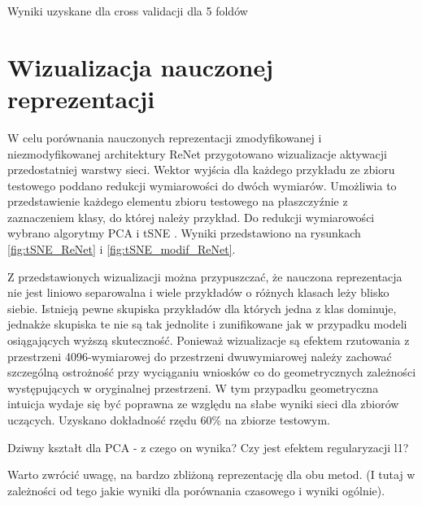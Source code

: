\documentclass[oneside, mag]{mgr}
\begin{document}
\begin{table}[ht]
    \centering
    \caption{Wyniki uzyskane dla cross validacji dla 5 foldów}
    
    \label{table:cross_validation}
\end{table}

\section{Wizualizacja nauczonej reprezentacji}

W celu porównania nauczonych reprezentacji zmodyfikowanej i niezmodyfikowanej architektury ReNet przygotowano wizualizacje aktywacji przedostatniej warstwy sieci. Wektor wyjścia dla każdego przykładu ze zbioru testowego poddano redukcji wymiarowości do dwóch wymiarów. Umożliwia to przedstawienie każdego elementu zbioru testowego na płaszczyźnie z zaznaczeniem klasy, do której należy przykład. Do redukcji wymiarowości wybrano algorytmy PCA i tSNE \cite{tSNE}. Wyniki przedstawiono na rysunkach \ref{fig:tSNE_ReNet} i \ref{fig:tSNE_modif_ReNet}.

Z przedstawionych wizualizacji można przypuszczać, że nauczona reprezentacja nie jest liniowo separowalna i wiele przykładów o różnych klasach leży blisko siebie. Istnieją pewne skupiska przykładów dla których jedna z klas dominuje, jednakże skupiska te nie są tak jednolite i zunifikowane jak w przypadku modeli osiągających wyższą skuteczność.
Ponieważ wizualizacje są efektem rzutowania z przestrzeni 4096-wymiarowej do przestrzeni dwuwymiarowej należy zachować szczególną ostrożność przy wyciąganiu wniosków co do geometrycznych zależności występujących w oryginalnej przestrzeni. W tym przypadku geometryczna intuicja wydaje się być poprawna ze względu na słabe wyniki sieci dla zbiorów uczących. Uzyskano dokładność rzędu 60\% na zbiorze testowym.

Dziwny kształt dla PCA - z czego on wynika? Czy jest efektem regularyzacji l1?

Warto zwrócić uwagę, na bardzo zbliżoną reprezentację dla obu metod. (I tutaj w zależności od tego jakie wyniki dla porównania czasowego i wyniki ogólnie).
\end{document}
